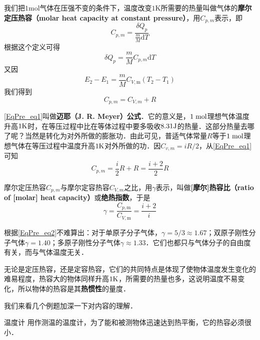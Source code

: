 我们把$1\mathrm{mol}$气体在压强不变的条件下，温度改变$1\mathrm K$所需要的热量叫做气体的\textbf{摩尔定压热容（molar heat capacity at constant pressure）}，用$C_{p,m}$表示，即
\begin{equation}
C_{p, {m}}=\frac{\delta Q_{p}}{\frac{m}{M} \mathrm{d} T}
\end{equation}
根据这个定义可得
\begin{equation}
\delta Q_{p}=\frac{m}{M} C_{p, {m}} \mathrm{d} T
\end{equation}
又因
\begin{equation}
E_{2}-E_{1}=\frac{m}{M} C_{V, \mathrm{m}}\left(T_{2}-T_{1}\right)
\end{equation}
我们得到
\begin{equation} \label{EqPre_eq1}
C_{p, m}=C_{V, m}+R
\end{equation}

\autoref{EqPre_eq1}叫做\textbf{迈耶（J. R. Meyer）公式}．它的意义是，$1\; \rm mol$理想气体温度升高$1\rm K$时，在等压过程中比在等体过程中要多吸收$8. 31\rm J $的热量．这部分热量去哪了呢？当然是转化为对外所做的膨胀功．由此可见，普适气体常量$R$等于$1\;\rm mol$理想气体在等压过程中温度升高$1\rm K$对外所做的功．因$C_{v, m}=iR/2$，从\autoref{EqPre_eq1}可知
\begin{equation}
C_{p, {m}}=\frac{i}{2} R+R=\frac{i+2}{2} R
\end{equation}

摩尔定压热容$C_{p,m}$与摩尔定容热容$C_{V,m}$之比，用$\gamma$表示，叫做\textbf{[摩尔]热容比（ratio of [molar] heat capacity）}或\textbf{绝热指数}，于是
\begin{equation} \label{EqPre_eq2}
\gamma=\frac{C_{p, \mathrm{m}}}{C_{V, \mathrm{m}}}=\frac{i+2}{i}
\end{equation}

根据\autoref{EqPre_eq2}不难算出：对于单原子分子气体，$\gamma=5/3\approx 1.67$；双原子刚性分子气体$\gamma=1.40$；多原子刚性分子气体$\gamma\approx 1. 33 $．它们也都只与气体分子的自由度有关，而与气体温度无关．

无论是定压热容，还是定容热容，它们的共同特点是体现了使物体温度发生变化的难易程度，热容大的物体同样升高$1\rm K$，所需要的热量也多，这说明温度不易变化，所以物体的热容是其\textbf{热惯性}的量度．

我们来看几个例题加深一下对内容的理解．

\begin{example}{温度计}
用作测温的温度计，为了能和被测物体迅速达到热平衡，它的热容必须很小．
\end{example}


